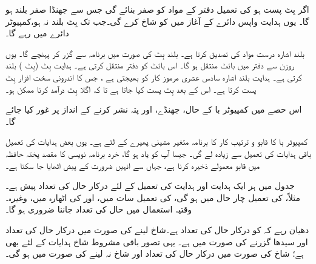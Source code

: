 اگر  بِٹ پست ہو  کی تعمیل دفتر  کے مواد کو صفر بنائے گی جس سے جھنڈا صفر بلند ہو گا۔ یوں ہدایت واپس       دائرے کے  آغاز میں  کو شاخ  کرے گی۔جب تک  بِٹ بلند نہ ہو،کمپیوٹر  دائرے  میں رہے گا۔

بلند  اشارہ درست مواد کی تصدیق کرتا ہے۔  بلند  بِٹ کی صورت میں  برنامہ \sJZ سے گزر کر  پہنچے گا۔ یوں روزن  سے دفتر  میں بائٹ منتقل ہو گا۔ \sMOV اس بائٹ کو دفتر  منتقل کرتی ہے۔ ہدایت   بِٹ (بِٹ ) بلند کرتی ہے۔  ہدایت بلند    اشارہ  سادس عشری مرموز کار کو بھیجتی ہے ، جس کا اندرونی سخت افزار   بِٹ پست کرتا ہے۔ اس کے بعد  بِٹ پست کیا جاتا ہے تا کہ اگلا بِٹ درآمد کرنا ممکن ہو۔

اس حصے میں کمپیوٹر با کے  حال، جھنڈے، اور  پتہ نشر کرنے کے انداز پر غور کیا جائے گا۔

کمپیوٹر با کا قابو و ترتیب کار کا برنامہ  متغیر مشینی پھیرے کے لئے   ہے۔ یوں بعض ہدایات کی تعمیل باقی ہدایات کی تعمیل سے  زیادہ  لے گی۔ جیسا آپ کو یاد ہو گا، خرد برنامہ نویسی کا مقصد پختہ حافظہ میں قابو  معمولے ذخیرہ کرنا ہے، جہاں سے انہیں ضرورت کے پیش  اٹھایا جا سکتا ہے۔

جدول    میں  ہر ایک ہدایت  اور ہدایت کی تعمیل کے لئے درکار  حال کی تعداد پیش ہے۔ مثلاً، \ADD{\regB} کی تعمیل چار  حال میں ہو گی،  کی تعمیل  سات میں،  اور \sCALL کی اٹھارہ میں، وغیرہ۔ وقتیہ استعمال میں  حال کی تعداد جاننا ضروری ہو گا۔

دھیان رہے کہ \sJM کو  درکار  حال  کی تعداد  ہے۔شاخ لینے کی صورت میں درکار   حال کی تعداد  اور سیدھا گزرنے کی صورت میں  ہے۔ یہی تصور باقی مشروط شاخ ہدایات کے لئے بھی  ہے؛ شاخ  کی صورت میں درکار  حال کی تعداد    اور شاخ نہ لینے کی صورت میں  ہو گی۔

